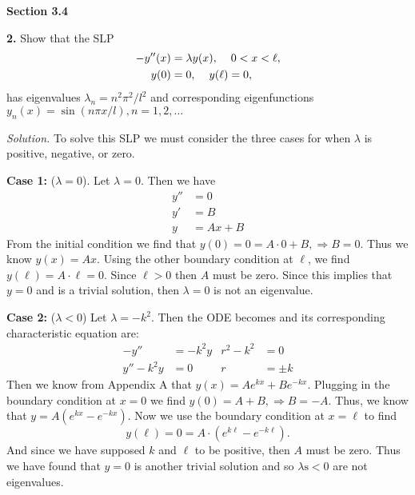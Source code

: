 \documentclass{article}
\begin{document}
\setlength{\parindent}{0cm}   %



\textbf{Section 3.4}

\textbf{2.}  Show that the SLP
\begin{align*}
-y''(x) &= \lambda y(x), \hspace{4mm} 0<x<\ell, \\
y(0)&=0,\hspace{4mm} y(\ell)=0, 
\end{align*}
has eigenvalues \( \lambda_n = n^2\pi^2/l^2 \) and corresponding eigenfunctions \(y_n(x) = \sin(n\pi x/l), n=1,2,\ldots \)

\vspace{3mm}
\textit{Solution.} To solve this SLP we must consider the three cases for when \(\lambda \) is positive, negative, or zero. 

\textbf{Case 1: }(\(\lambda = 0\)).  Let \( \lambda = 0\). Then we have
\begin{align*}
y'' &= 0  \\ 
y' &= B \\
y&= Ax+ B
\end{align*}
From the initial condition we find that \(y(0) = 0 = A\cdot 0+ B , \Rightarrow B=0\). Thus we know \(y(x) = Ax\). Using the other boundary condition at \(\ell\), we find \(y(\ell) = A\cdot \ell =0 \). Since \(\ell>0 \) then \(A\) must be zero. Since this implies that \(y=0\) and is a trivial solution, then \(\lambda =0\) is not an eigenvalue. 

\vspace{2mm}
\textbf{Case 2: }(\( \lambda <0\)) Let \(\lambda = -k^2\). Then the ODE becomes and its corresponding characteristic equation are:
 \begin{align*}
-y'' &= -k^2y &    r^2 -k^2 &= 0 \\
y'' - k^2y &=0 & r &= \pm k 
\end{align*}
Then we know from Appendix A that \(y(x) = Ae^{kx} + Be^{-kx} \). Plugging in the boundary condition at \(x=0\) we find \(y(0)= A + B, \Rightarrow B=-A\). Thus, we know that \(y = A (e^{kx}-e^{-kx} ) \). Now we use the boundary condition at \(x=\ell\) to find 
\[y(\ell) = 0 = A \cdot(e^{k\ell} - e^{-k\ell} ). \] 
And since we have supposed \(k \) and \( \ell\) to be positive, then \(A\) must be zero. Thus we have found that \(y=0\) is another trivial solution and so \(\lambda\text{s} <0\) are not eigenvalues. 
\end{document}
